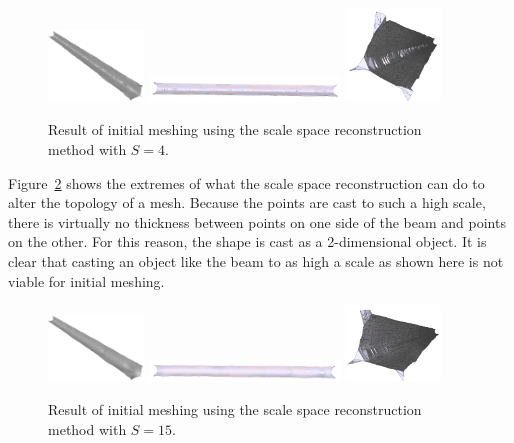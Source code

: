 \documentclass[12pt]{drexelthesis}
\begin{document}
\begin{figure}[!ht]
	\centering
		\includegraphics[width=1in]{simulated-lab-scan/0noise/clean/scalespace400.png}
		\includegraphics[width=2in]{simulated-lab-scan/0noise/clean/scalespace401.png}
		\includegraphics[width=1in]{simulated-lab-scan/0noise/clean/scalespace402.png}
		\caption[Initial meshing using a scale space reconstruction with $S = 4$]{\centering  Result of initial meshing using the scale space reconstruction method with $S = 4$.}
		\label{zeronoise:scalespace4}
\end{figure}

Figure~\ref{zeronoise:scalespace15} shows the extremes of what the scale space reconstruction can do to alter the topology of a mesh. Because the points are cast to such a high scale, there is virtually no thickness between points on one side of the beam and points on the other. For this reason, the shape is cast as a 2-dimensional object. It is clear that casting an object like the beam to as high a scale as shown here is not viable for initial meshing. 

\begin{figure}[!ht]
	\centering
		\includegraphics[width=1in]{simulated-lab-scan/0noise/clean/scalespace1500.png}
		\includegraphics[width=2in]{simulated-lab-scan/0noise/clean/scalespace1501.png}
		\includegraphics[width=1in]{simulated-lab-scan/0noise/clean/scalespace1502.png}
		\caption[Initial meshing using a scale space reconstruction with $S = 15$]{\centering  Result of initial meshing using the scale space reconstruction method with $S = 15$.}
		\label{zeronoise:scalespace15}
\end{figure}
\end{document}
